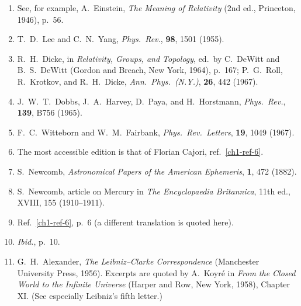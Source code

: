 \begin{enumerate}
  \item {}\label{ch1-ref-8}
  See, for example, A.\ Einstein, \emph{The Meaning of Relativity} (2nd ed.,
  Princeton, 1946), p.\ 56.

  \item {}\label{ch1-ref-9}
  T.\ D.\ Lee and C.\ N.\ Yang, \emph{Phys.\ Rev.}, \textbf{98}, 1501
  (1955).

  \item {}\label{ch1-ref-10}
  R.\ H.\ Dicke, in \emph{Relativity, Groups, and Topology}, ed.\ by C.\
  DeWitt and B.\ S.\ DeWitt (Gordon and Breach, New York, 1964), p.\ 167;
  P.\ G.\ Roll, R.\ Krotkov, and R.\ H.\ Dicke, \emph{Ann.\ Phys.\ (N.Y.)},
  \textbf{26}, 442 (1967).

  \item {}\label{ch1-ref-11}
  J.\ W.\ T.\ Dobbs, J.\ A.\ Harvey, D.\ Paya, and H.\ Horstmann,
  \emph{Phys.\ Rev.}, \textbf{139}, B756 (1965).

  \item {}\label{ch1-ref-12}
  F.\ C.\ Witteborn and W.\ M.\ Fairbank, \emph{Phys.\ Rev.\ Letters},
  \textbf{19}, 1049 (1967).

  \item {}\label{ch1-ref-13}
  The most accessible edition is that of Florian Cajori,
  ref.~\ref{ch1-ref-6}.

  \item {}\label{ch1-ref-14}
  S.\ Newcomb, \emph{Astronomical Papers of the American Ephemeris},
  \textbf{1}, 472 (1882).

  \item {}\label{ch1-ref-15}
  S.\ Newcomb, article on Mercury in \emph{The Encyclopaedia Britannica},
  11th ed., XVIII, 155 (1910--1911).

  \item {}\label{ch1-ref-16}
  Ref.~\ref{ch1-ref-6}, p.\ 6 (a different translation is quoted here).

  \item {}\label{ch1-ref-17}
  \emph{Ibid.}, p.\ 10.

  \item {}\label{ch1-ref-18}
  G.\ H.\ Alexander, \emph{The Leibniz--Clarke Correspondence} (Manchester
  University Press, 1956). Excerpts are quoted by A.\ Koyr\'e in
  \emph{From the Closed World to the Infinite Universe} (Harper and Row,
  New York, 1958), Chapter XI. (See especially Leibniz's fifth letter.)


\end{enumerate}
